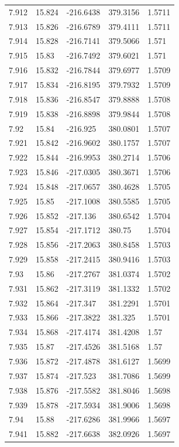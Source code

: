 \begin{tabular}{lllll}
7.912 & 15.824 & -216.6438 & 379.3156 & 1.5711 \\
7.913 & 15.826 & -216.6789 & 379.4111 & 1.5711 \\
7.914 & 15.828 & -216.7141 & 379.5066 & 1.571 \\
7.915 & 15.83 & -216.7492 & 379.6021 & 1.571 \\
7.916 & 15.832 & -216.7844 & 379.6977 & 1.5709 \\
7.917 & 15.834 & -216.8195 & 379.7932 & 1.5709 \\
7.918 & 15.836 & -216.8547 & 379.8888 & 1.5708 \\
7.919 & 15.838 & -216.8898 & 379.9844 & 1.5708 \\
7.92 & 15.84 & -216.925 & 380.0801 & 1.5707 \\
7.921 & 15.842 & -216.9602 & 380.1757 & 1.5707 \\
7.922 & 15.844 & -216.9953 & 380.2714 & 1.5706 \\
7.923 & 15.846 & -217.0305 & 380.3671 & 1.5706 \\
7.924 & 15.848 & -217.0657 & 380.4628 & 1.5705 \\
7.925 & 15.85 & -217.1008 & 380.5585 & 1.5705 \\
7.926 & 15.852 & -217.136 & 380.6542 & 1.5704 \\
7.927 & 15.854 & -217.1712 & 380.75 & 1.5704 \\
7.928 & 15.856 & -217.2063 & 380.8458 & 1.5703 \\
7.929 & 15.858 & -217.2415 & 380.9416 & 1.5703 \\
7.93 & 15.86 & -217.2767 & 381.0374 & 1.5702 \\
7.931 & 15.862 & -217.3119 & 381.1332 & 1.5702 \\
7.932 & 15.864 & -217.347 & 381.2291 & 1.5701 \\
7.933 & 15.866 & -217.3822 & 381.325 & 1.5701 \\
7.934 & 15.868 & -217.4174 & 381.4208 & 1.57 \\
7.935 & 15.87 & -217.4526 & 381.5168 & 1.57 \\
7.936 & 15.872 & -217.4878 & 381.6127 & 1.5699 \\
7.937 & 15.874 & -217.523 & 381.7086 & 1.5699 \\
7.938 & 15.876 & -217.5582 & 381.8046 & 1.5698 \\
7.939 & 15.878 & -217.5934 & 381.9006 & 1.5698 \\
7.94 & 15.88 & -217.6286 & 381.9966 & 1.5697 \\
7.941 & 15.882 & -217.6638 & 382.0926 & 1.5697 \\

\end{tabular}
